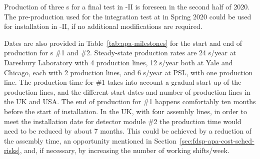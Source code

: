 Production of three s for a final test in -II is foreseen in the second half of 2020. The pre-production  used for the integration test at  in Spring 2020 could be used for installation in -II, if no additional modifications are required.

Dates are also provided in Table~\ref{tab:apa-milestones} for the start and end of  production for s \#1 and \#2. Steady-state production rates are 24 s/year at Daresbury Laboratory with 4 production lines, 12 s/year both at Yale and Chicago, each with 2 production lines, and 6 s/year at PSL, with one production line. The production time for  \#1 takes into account a gradual start-up of the production lines, and the different start dates and number of production lines in the UK and USA. The end of  production for  \#1 happens comfortably ten months before the start of installation. In the UK, with four assembly lines, in order to meet the installation date for detector module \#2 the  production time would need to be reduced by about 7 months. This could be achieved by a reduction of the  assembly time, an opportunity mentioned in Section~\ref{sec:fdsp-apa-cost-sched-risks}, and, if necessary, by increasing the number of working shifts/week.
%

\begin{comment}
\begin{dunetable}
[APA production schedule]
{lccccccc}
{tab:apa-production-schedule}
{Estimated schedule of \dword{apa} construction at each of the \dword{apa} production sites.}
Production Site & \textbf{2020} & \textbf{2021} & \textbf{2022} & \textbf{2023} & \textbf{2024} & \textbf{2025} & \textbf{Total} \\ \colhline
Daresbury Laboratory & 6 & 24 & 26 & 32 & 32 & 32 & \color{red} 152 \\ \colhline
University of Chicago & 0 & 10 & 13 & 13 & 13 & 11 & \color{red} 60 \\ \colhline
Yale University & 0 & 10 & 13 & 13 & 13 & 11 & \color{red} 60 \\ \colhline
University of Wisconsin-PSL & 0 & 3 & 7 & 7 & 7 & 8 & \color{red} 32 \\ \Xhline{3\arrayrulewidth}
Running Total & 6 & 53 & 112 & 177 & 242 & 304 &  \\
\end{dunetable}
\end{comment}

